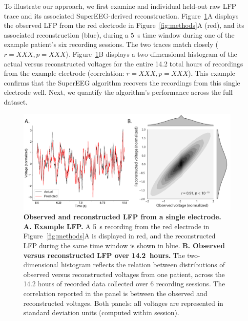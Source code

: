 \documentclass[11pt]{article}
\begin{document}
To illustrate our approach, we first examine and individual held-out
raw LFP trace and its associated SuperEEG-derived reconstruction.
Figure~\ref{fig:recon}A displays the observed LFP from the red
electrode in Figure~\ref{fig:methods}A (red), and its associated
reconstruction (blue), during a 5~s time window during one of the
example patient's six recording sessions.  The two traces match
closely ($r = XXX, p = XXX$).
Figure~\ref{fig:recon}B displays a
two-dimensional histogram of the actual versus reconstructed voltages
for the entire 14.2 total hours of recordings from the example electrode
(correlation: $r = XXX, p = XXX$).
This example confirms that the SuperEEG algorithm recovers the recordings
from this single electrode well.  Next, we quantify the algorithm's
performance across the full dataset.

\begin{figure}
  \centering
  \includegraphics[width=\textwidth]{figs/recon}
  \caption{\textbf{Observed and reconstructed LFP from a single
      electrode.} \textbf{A. Example LFP.}  A 5~s recording from the
    red electrode in Figure~\ref{fig:methods}A is displayed in red,
    and the reconstructed LFP during the same time window is shown in
    blue.  \textbf{B. Observed versus reconstructed LFP over
      14.2~hours.}  The two-dimensional histogram reflects the
    relation between distributions of observed versus reconstructed
    voltages from one patient, across the 14.2 hours of recorded data
    collected over 6 recording sessions.  The correlation reported in
    the panel is between the observed and reconstructed voltages.
    Both panels: all voltages are represented in standard deviation units
   (computed within session).}
  \label{fig:recon}
\end{figure}
\end{document}
